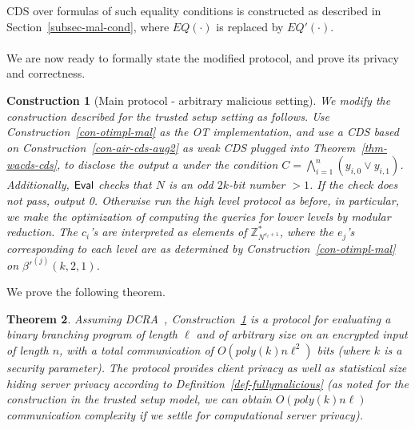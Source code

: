 \documentclass[11pt]{article}
\newtheorem{theorem}{Theorem}[section]{}
\newtheorem{construction}[theorem]{Construction}
\newcommand{\eval}{{\sf Eval}}
\newcommand{\U}[1]{\mathbb{Z}_{#1}^*}
\newcommand\ot{\mbox{OT}\xspace}
\begin{document}
CDS over formulas of such equality conditions is constructed as described in Section~\ref{subsec-mal-cond},
where $EQ(\cdot)$ is replaced by $EQ'(\cdot)$.
\paragraph{}We are now ready to formally state the modified protocol, and prove its privacy and correctness.
\begin{construction}[Main protocol - arbitrary malicious setting]
  \label{con-main-fullymal}
  We modify the construction described for the trusted setup setting as follows.
  Use Construction~\ref{con-otimpl-mal} as the \ot implementation,
  and use a CDS based on Construction~\ref{con-air-cds-aug2} as weak CDS plugged into Theorem~\ref{thm-wacds-cds}, to disclose the output $a$ under the condition $C=\bigwedge^n_{i=1}(y_{i,0}\vee y_{i,1})$.
  Additionally, $\eval$ checks that $N$ is an odd $2k$-bit number $>1$. If the check does not pass, output 0. Otherwise run the high level protocol as before, in particular, we make the optimization of computing the queries for lower levels by modular reduction. The $c_i$'s are interpreted as elements of $\U{N^{e_{\ell}+1}}$, where the $e_j$'s corresponding to each level are as determined by Construction~\ref{con-otimpl-mal} on $\beta'^{(j)}(k,2,1)$.
\end{construction}
We prove the following theorem.
\begin{theorem}
  Assuming DCRA~\cite{DJ01}, Construction~\ref{con-main-fullymal} is a protocol for evaluating a
  binary branching program of length $\ell$ and of arbitrary size on
  an encrypted input of length $n$, with a total communication of
  $O(poly(k)n\ell^2)$ bits (where $k$ is a security parameter). The protocol
  provides client privacy as well as statistical size hiding server privacy
  according to Definition~\ref{def-fullymalicious} (as noted for the construction in the trusted setup model, we can obtain $O(poly(k)n\ell)$ communication complexity if we settle for computational server privacy).
\end{theorem}
\end{document}
